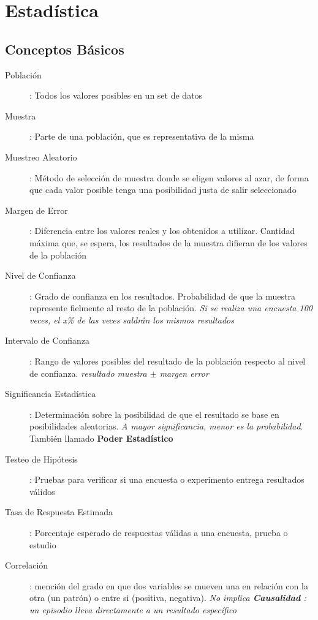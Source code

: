 
\section{Estadística}
\subsection{Conceptos Básicos}
\begin{description}
    \item [Población]{ : Todos los valores posibles en un set de datos}
    \item [Muestra]{ : Parte de una población, que es representativa de la misma}
    \item [Muestreo Aleatorio]{ : Método de selección de muestra donde se eligen valores al azar, de forma que cada valor posible tenga una posibilidad justa de salir seleccionado}
    \item [Margen de Error]{ : Diferencia entre los valores reales y los obtenidos a utilizar. Cantidad máxima que, se espera, los resultados de la muestra difieran de los valores de la población}
    \item [Nivel de Confianza]{ : Grado de confianza en los resultados. Probabilidad de que la muestra represente fielmente al resto de la población. \textit{Si se realiza una encuesta 100 veces, el x\% de las veces saldrán los mismos resultados}}
    \item [Intervalo de Confianza]{ : Rango de valores posibles del resultado de la población respecto al nivel de confianza. \textit{resultado muestra ${\pm}$ margen error}}
    \item [Significancia Estadística]{ : Determinación sobre la posibilidad de que el resultado se base en posibilidades aleatorias. \textit{A mayor significancia, menor es la probabilidad}. También llamado \textbf{Poder Estadístico}} 
    \item [Testeo de Hipótesis]{ : Pruebas para verificar si una encuesta o experimento entrega resultados válidos}
    \item [Tasa de Respuesta Estimada]{ : Porcentaje esperado de respuestas válidas a una encuesta, prueba o estudio}
    \item [Correlación]{ : mención del grado en que dos variables se mueven una en relación con la otra (un patrón) o entre si (positiva, negativa). \textit{No implica \textbf{Causalidad} : un episodio lleva directamente a un resultado específico}}
\end{description}

